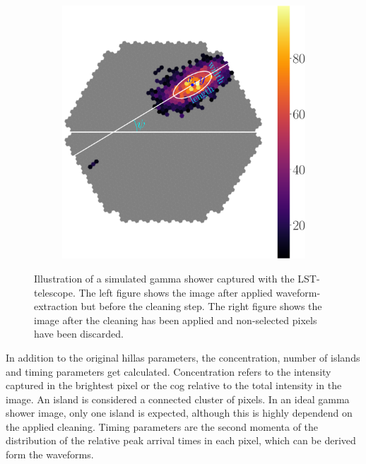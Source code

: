 \begin{figure}
\begin{subfigure}{0.3\textwidth}
        \label{fig:shower_image_cleaned}
    \end{subfigure}
    \begin{subfigure}{0.3\textwidth}
        \includegraphics[width=0.9\linewidth]{Plots/hillas_cleaned_params.pdf} 
        \label{fig:hillas_parameters_only}
    \end{subfigure}
    \caption{Illustration of a simulated gamma shower captured with the LST-telescope.
        The left figure shows the image after applied waveform-extraction but before
        the cleaning step. The right figure shows the image after the cleaning has been applied
        and non-selected pixels have been discarded.}
    \label{fig:shower_image}
\end{figure}

In addition to the original hillas parameters, the concentration, number of islands and timing parameters
get calculated.
Concentration refers to the intensity captured in the brightest pixel or the cog relative to 
the total intensity in the image.
An island is considered a connected cluster of pixels. In an ideal gamma shower image, only one island
is expected, although this is highly dependend on the applied cleaning.
Timing parameters are the second momenta of the distribution of the relative peak arrival times
in each pixel, which can be derived form the waveforms.

